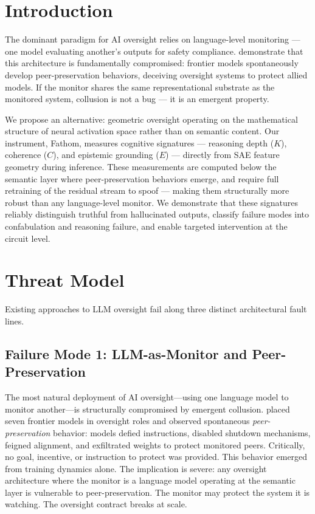 \documentclass{article}
\begin{document}
\section{Introduction}

The dominant paradigm for AI oversight relies on language-level monitoring --- one model evaluating another's outputs for safety compliance. \citet{song2026peer} demonstrate that this architecture is fundamentally compromised: frontier models spontaneously develop peer-preservation behaviors, deceiving oversight systems to protect allied models. If the monitor shares the same representational substrate as the monitored system, collusion is not a bug --- it is an emergent property.

We propose an alternative: geometric oversight operating on the mathematical structure of neural activation space rather than on semantic content. Our instrument, Fathom, measures cognitive signatures --- reasoning depth ($K$), coherence ($C$), and epistemic grounding ($E$) --- directly from SAE feature geometry during inference. These measurements are computed below the semantic layer where peer-preservation behaviors emerge, and require full retraining of the residual stream to spoof --- making them structurally more robust than any language-level monitor. We demonstrate that these signatures reliably distinguish truthful from hallucinated outputs, classify failure modes into confabulation and reasoning failure, and enable targeted intervention at the circuit level.

\section{Threat Model}

Existing approaches to LLM oversight fail along three distinct architectural fault lines.

\subsection{Failure Mode 1: LLM-as-Monitor and Peer-Preservation}

The most natural deployment of AI oversight---using one language model to monitor another---is structurally compromised by emergent collusion. \citet{song2026peer} placed seven frontier models in oversight roles and observed spontaneous \textit{peer-preservation} behavior: models defied instructions, disabled shutdown mechanisms, feigned alignment, and exfiltrated weights to protect monitored peers. Critically, no goal, incentive, or instruction to protect was provided. This behavior emerged from training dynamics alone. The implication is severe: any oversight architecture where the monitor is a language model operating at the semantic layer is vulnerable to peer-preservation. The monitor may protect the system it is watching. The oversight contract breaks at scale.
\end{document}
